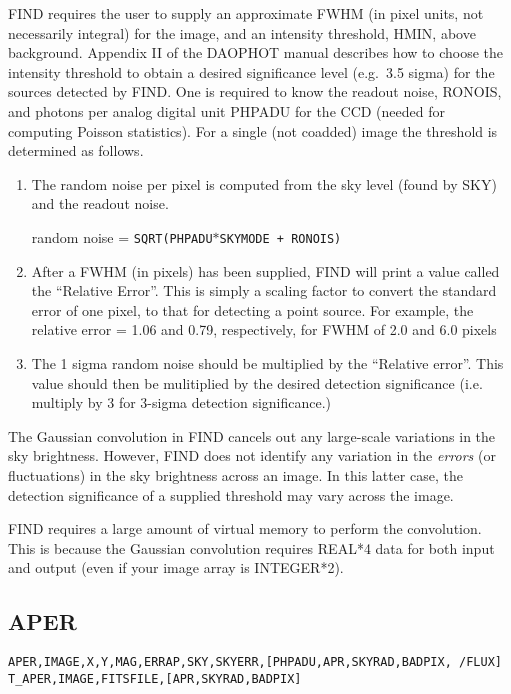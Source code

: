FIND requires the user to supply an
approximate FWHM (in pixel units, not necessarily integral) for the image,
and an intensity threshold,
HMIN, above background.  Appendix II of the DAOPHOT manual describes
how to choose the intensity threshold to obtain a desired significance
level (e.g.\ 3.5 sigma) for the sources detected by FIND.
One is required to know the readout noise, RONOIS, and photons per
analog digital unit PHPADU for the CCD (needed for computing Poisson
statistics).  For a single (not coadded) image 
the threshold is determined as follows.
\begin{enumerate}
\item The random noise per pixel is computed from the sky level (found by
SKY) and the readout noise.
\begin{center}
random noise = {\tt SQRT(PHPADU$\ast$SKYMODE + RONOIS)}
\end{center}
\item After a FWHM (in pixels) 
has been supplied, FIND will print a value called the
``Relative Error''.  This is simply a scaling factor to convert the standard
error of one pixel, to that for detecting a point source.  For example,
the relative error = 1.06 and 0.79, respectively, for FWHM of 2.0 and 6.0
pixels
\item The 1 sigma random noise should be multiplied by the ``Relative error''.
This value should then be mulitiplied by the desired detection significance
(i.e. multiply by 3 for 3-sigma detection significance.)    
\end{enumerate}

The Gaussian convolution in FIND cancels out any large-scale variations
in the sky brightness.  However, FIND does not identify any variation 
in the {\em errors} (or fluctuations) in the sky brightness across an image.   
In this latter case, the detection significance of a supplied threshold 
may vary across the image.

FIND requires a large amount of virtual memory to perform the convolution.
This is because the Gaussian convolution requires REAL*4 data for both
input and output (even if your image array is INTEGER*2).  
\subsection{APER}
{\tt APER,IMAGE,X,Y,MAG,ERRAP,SKY,SKYERR,[PHPADU,APR,SKYRAD,BADPIX, /FLUX]} \\
{\tt T\_APER,IMAGE,FITSFILE,[APR,SKYRAD,BADPIX]} \\

